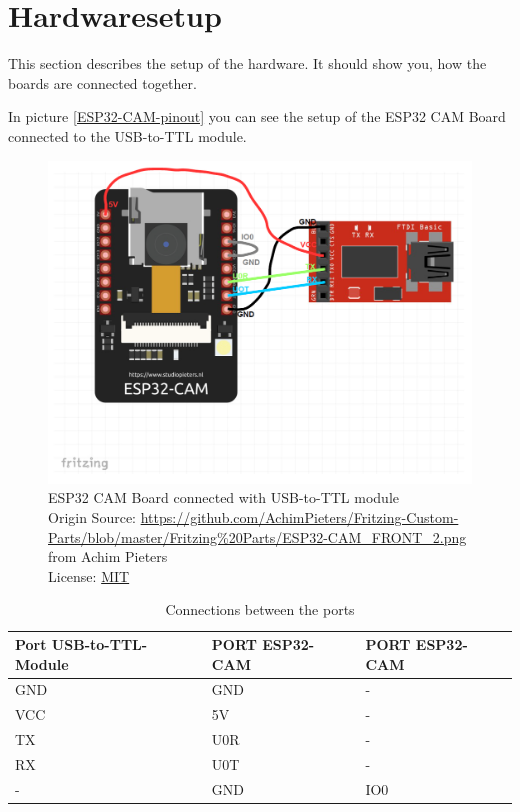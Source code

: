 \graphicspath{ {./hardware_installation/pictures/} }
\section{Hardwaresetup}
This section describes the setup of the hardware. It should show you,
how the boards are connected together.

In picture \ref{ESP32-CAM-pinout} you can see the setup of the ESP32 CAM Board connected to the USB-to-TTL module.

\begin{figure}[H]
\centering
\includegraphics[width=\textwidth]{esp32_cam-ftdi}
\caption[ESP32 CAM Board connected with USB-to-TTL module]{ESP32 CAM Board connected with USB-to-TTL module \\ Origin Source: \url{https://github.com/AchimPieters/Fritzing-Custom-Parts/blob/master/Fritzing\%20Parts/ESP32-CAM_FRONT_2.png}\\ from Achim Pieters \\ License: \href{https://opensource.org/licenses/MIT}{MIT}}
\label{ESP32-CAM-USB-TO-TTL}
\end{figure}

\begin{table}[H]
\begin{tabular}{|l|l|l|}
\hline
Port USB-to-TTL-Module & PORT ESP32-CAM & PORT ESP32-CAM \\ \hline
GND                    & GND            & -              \\ \hline
VCC                    & 5V             & -              \\ \hline
TX                     & U0R            & -              \\ \hline
RX                     & U0T            & -              \\ \hline
-                      & GND            & IO0            \\ \hline
\end{tabular}
\caption{\label{tab:Port-Connections}Connections between the ports}
\end{table}

